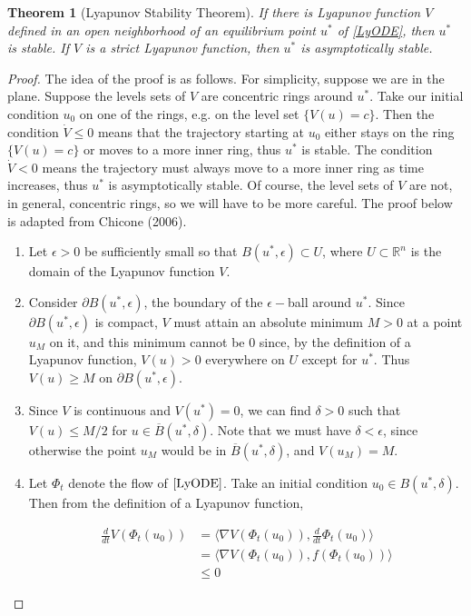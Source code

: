 \documentclass{article}
\newtheorem{theorem}{Theorem}[section]
\def\R{{\mathbb R}}
\begin{document}
\begin{theorem}[Lyapunov Stability Theorem]
If there is Lyapunov function $V$ defined in an open neighborhood of an equilibrium point $u^*$ of \eqref{LyODE}, then $u^*$ is stable. If $V$ is a strict Lyapunov function, then $u^*$ is asymptotically stable.
\end{theorem}
\begin{proof}
The idea of the proof is as follows. For simplicity, suppose we are in the plane. Suppose the levels sets of $V$ are concentric rings around $u^*$. Take our initial condition $u_0$ on one of the rings, e.g. on the level set $\{V(u) = c\}$. Then the condition $\dot{V} \leq 0$ means that the trajectory starting at $u_0$ either stays on the ring $\{V(u) = c\}$ or moves to a more inner ring, thus $u^*$ is stable. The condition $\dot{V} < 0$ means the trajectory must always move to a more inner ring as time increases, thus $u^*$ is asymptotically stable. Of course, the level sets of $V$ are not, in general, concentric rings, so we will have to be more careful. The proof below is adapted from Chicone (2006).

\begin{enumerate}
	\item Let $\epsilon > 0$ be sufficiently small so that $B(u^*, \epsilon) \subset U$, where $U \subset \R^n$ is the domain of the Lyapunov function $V$.

	\item Consider $\partial B(u^*, \epsilon)$, the boundary of the $\epsilon-$ball around $u^*$. Since $\partial B(u^*, \epsilon)$ is compact, $V$ must attain an absolute minimum $M > 0$ at a point $u_M$ on it, and this minimum cannot be 0 since, by the definition of a Lyapunov function, $V(u) > 0$ everywhere on $U$ except for $u^*$. Thus $V(u) \geq M$ on $\partial B(u^*, \epsilon)$. 

	\item Since $V$ is continuous and $V(u^*) = 0$, we can find $\delta > 0$ such that $V(u) \leq M/2$ for $u \in \overline{B}(u^*, \delta)$. Note that we must have $\delta < \epsilon$, since otherwise the point $u_M$ would be in $\overline{B}(u^*, \delta)$, and $V(u_M) = M$.

	\item Let $\Phi_t$ denote the flow of $\eqref{LyODE}$. Take an initial condition $u_0 \in B(u^*, \delta)$. Then from the definition of a Lyapunov function, 

	\begin{align*}
	\frac{d}{dt} V(\Phi_t(u_0)) 
	&= \langle \nabla V(\Phi_t(u_0)), \frac{d}{dt} \Phi_t(u_0) \rangle \\
	&= \langle \nabla V(\Phi_t(u_0)), f(\Phi_t(u_0)) \rangle \\
	&\leq 0
	\end{align*}


\end{enumerate}
\end{proof}
\end{document}
